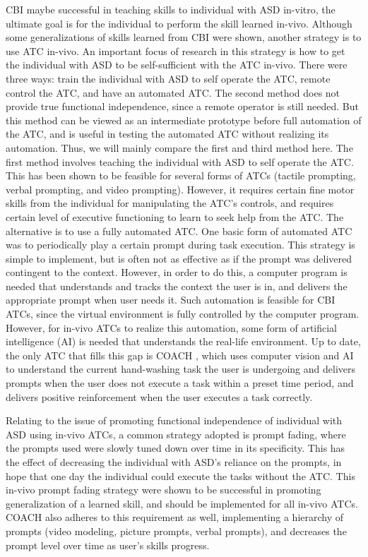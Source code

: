 CBI maybe successful in teaching skills to individual with ASD in-vitro, the ultimate goal is for the individual to perform the skill learned in-vivo.  Although some generalizations of skills learned from CBI were shown, another strategy is to use ATC in-vivo.  An important focus of research in this strategy is how to get the individual with ASD to be self-sufficient with the ATC in-vivo.  There were three ways: train the individual with ASD to self operate the ATC, remote control the ATC, and have an automated ATC.  The second method does not provide true functional independence, since a remote operator is still needed.  But this method can be viewed as an intermediate prototype before full automation of the ATC, and is useful in testing the automated ATC without realizing its automation.  Thus, we will mainly compare the first and third method here.  The first method involves teaching the individual with ASD to self operate the ATC.  This has been shown to be feasible for several forms of ATCs (tactile prompting, verbal prompting, and video prompting).  However, it requires certain fine motor skills from the individual for manipulating the ATC's controls, and requires certain level of executive functioning to learn to seek help from the ATC.  The alternative is to use a fully automated ATC.  One basic form of automated ATC was to periodically play a certain prompt during task execution.  This strategy is simple to implement, but is often not as effective as if the prompt was delivered contingent to the context.  However, in order to do this, a computer program is needed that understands and tracks the context the user is in, and delivers the appropriate prompt when user needs it.  Such automation is feasible for CBI ATCs, since the virtual environment is fully controlled by the computer program.  However, for in-vivo ATCs to realize this automation, some form of artificial intelligence (AI) is needed that understands the real-life environment.  Up to date, the only ATC that fills this gap is COACH \cite{bimbrahw2012investigating}, which uses computer vision and AI to understand the current hand-washing task the user is undergoing and delivers prompts when the user does not execute a task within a preset time period, and delivers positive reinforcement when the user executes a task correctly.

Relating to the issue of promoting functional independence of individual with ASD using in-vivo ATCs, a common strategy adopted is prompt fading, where the prompts used were slowly tuned down over time in its specificity.  This has the effect of decreasing the individual with ASD's reliance on the prompts, in hope that one day the individual could execute the tasks without the ATC.  This in-vivo prompt fading strategy were shown to be successful in promoting generalization of a learned skill, and should be implemented for all in-vivo ATCs.  COACH also adheres to this requirement as well, implementing a hierarchy of prompts (video modeling, picture prompts, verbal prompts), and decreases the prompt level over time as user's skills progress.

